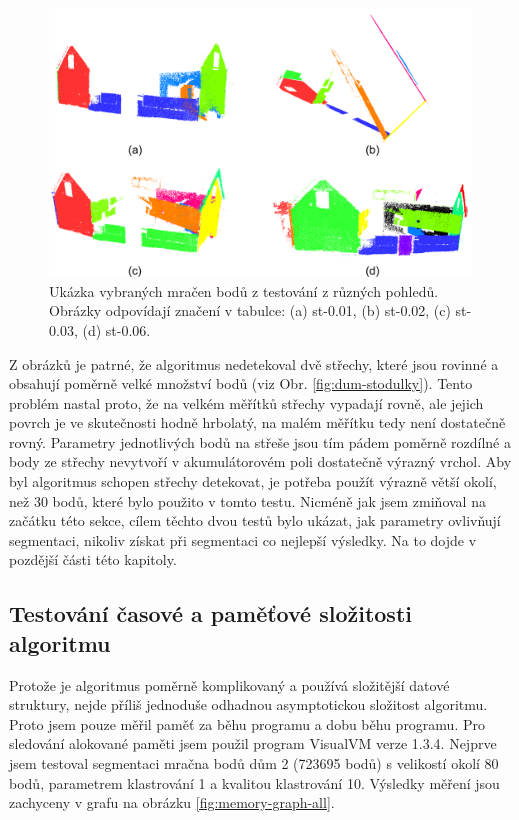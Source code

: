 \documentclass[11pt,twoside,a4paper]{book}
\begin{document}
\begin{figure}[ht]
\begin{center}
\includegraphics[width=\textwidth]{figures/test-stodulky-seg}
\caption{Ukázka vybraných mračen bodů z testování z různých pohledů. Obrázky odpovídají značení v tabulce: (a) st-0.01, (b) st-0.02, (c) st-0.03, (d) st-0.06.}
\label{fig:test-stodulky-seg}
\end{center}
\end{figure}

Z obrázků je patrné, že algoritmus nedetekoval dvě střechy, které jsou rovinné a obsahují poměrně velké množství bodů (viz Obr. \ref{fig:dum-stodulky}). Tento problém nastal proto, že na velkém měřítků střechy vypadají rovně, ale jejich povrch je ve skutečnosti hodně hrbolatý, na malém měřítku tedy není dostatečně rovný. Parametry jednotlivých bodů na střeše jsou tím pádem poměrně rozdílné a body ze střechy nevytvoří v akumulátorovém poli dostatečně výrazný vrchol. Aby byl algoritmus schopen střechy detekovat, je potřeba použít výrazně větší okolí, než 30 bodů, které bylo použito v tomto testu. Nicméně jak jsem zmiňoval na začátku této sekce, cílem těchto dvou testů bylo ukázat, jak parametry ovlivňují segmentaci, nikoliv získat při segmentaci co nejlepší výsledky. Na to dojde v pozdější části této kapitoly.

\subsection{Testování časové a paměťové složitosti algoritmu}

Protože je algoritmus poměrně komplikovaný a používá složitější datové struktury, nejde příliš jednoduše odhadnou asymptotickou složitost algoritmu. Proto jsem pouze měřil paměť za běhu programu a dobu běhu programu. Pro sledování alokované paměti jsem použil program VisualVM verze 1.3.4. Nejprve jsem testoval  segmentaci mračna bodů dům 2 (723695 bodů) s velikostí okolí 80 bodů, parametrem klastrování 1 a kvalitou klastrování 10. Výsledky měření jsou zachyceny v grafu na obrázku \ref{fig:memory-graph-all}.
\end{document}
